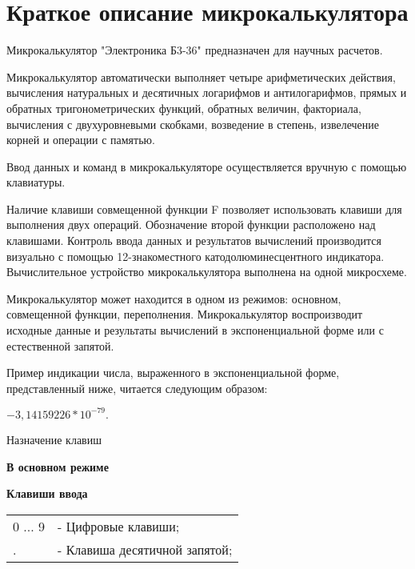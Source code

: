 \documentclass[12pt]{article} %
\begin{document}
\section{Краткое описание микрокалькулятора}


Микрокалькулятор "Электроника Б3-36" предназначен для научных расчетов.

Микрокалькулятор автоматически выполняет четыре арифметических действия, вычисления натуральных и десятичных логарифмов и антилогарифмов, прямых и обратных тригонометрических функций, обратных величин, факториала, вычисления с двухуровневыми скобками, возведение в степень, извелечение корней и операции с памятью.

Ввод данных и команд в микрокалькуляторе осуществляется вручную с помощью клавиатуры.

Наличие клавиши совмещенной функции F позволяет использовать клавиши для выполнения двух операций. Обозначение второй функции расположено над клавишами. Контроль ввода данных и результатов вычислений производится визуально с помощью 12-знакоместного катодолюминесцентного индикатора. Вычислительное устройство микрокалькулятора выполнена на одной микросхеме.

Микрокалькулятор может находится в одном из режимов: основном, совмещенной функции, переполнения. Микрокалькулятор воспроизводит исходные данные и результаты вычислений в экспоненциальной форме или с естественной запятой.

Пример индикации числа, выраженного в экспоненциальной форме, представленный ниже, читается следующим образом: 

\begin{center}
$-3,14159226 * 10^{-79}.$
\end{center}


{\centering Назначение клавиш \par}
\vspace{0.25cm}

\textbf{В основном режиме}
\vspace{0.25cm}

\textbf{Клавиши ввода}
\vspace{0.5cm}

\begin{tabular}{p{2cm} p{9cm}}
0 ... 9 & - Цифровые клавиши; \\
.       & - Клавиша десятичной запятой; \\
\end{tabular}

\newpage
\end{document}
